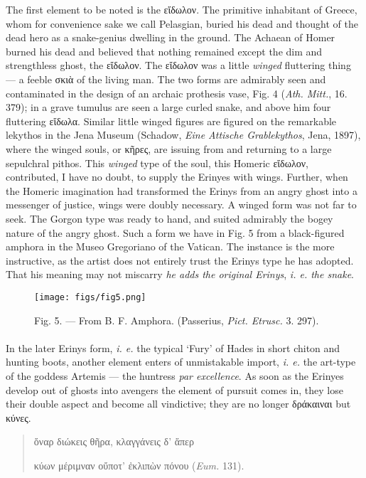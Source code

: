 \documentclass[a4paper, 11pt, oneside, polutonikogreek, english]{article}
\begin{document}
The first element to be noted is the εἴδωλον. The primitive inhabitant of Greece, whom for convenience sake we call Pelasgian, buried his dead and thought of the dead hero as a snake-genius dwelling in the ground. The Achaean of Homer burned his dead and believed that nothing remained except the dim and strengthless ghost, the εἴδωλον. The εἴδωλον was a little \emph{winged} fluttering thing --- a feeble σκιὰ of the living man. The two forms are admirably seen and contaminated in the design of an archaic prothesis vase, Fig. 4 (\emph{Ath. Mitt.}, 16. 379); in a grave tumulus are seen a large curled snake, and above him four fluttering εἴδωλα. Similar little winged figures are figured on the remarkable lekythos in the Jena Museum (Schadow, \emph{Eine Attische Grablekythos}, Jena, 1897), where the winged souls, or κῆρες, are issuing from and returning to a large sepulchral pithos. This \emph{winged} type of the soul, this Homeric εἴδωλον, contributed, I have no doubt, to supply the Erinyes with wings. Further, when the Homeric imagination had transformed the Erinys from an angry ghost into a messenger of justice, wings were doubly necessary. A winged form was not far to seek. The Gorgon type was ready to hand, and suited admirably the bogey nature of the angry ghost. Such a form we have in Fig. 5 from a black-figured amphora in the Museo Gregoriano of the Vatican. The instance is the more instructive, as the artist does not entirely trust the Erinys type he has adopted. That his meaning may not miscarry \emph{he adds the original Erinys}, \emph{i. e. the snake}.
\begin{figure}[H]
\centering
\texttt{[image: figs/fig5.png]}
\caption{\Fontauri Fig. 5. --- From B. F. Amphora. (Passerius, \emph{Pict. Etrusc.} 3. 297).}
\end{figure}
\paragraph{}
In the later Erinys form, \emph{i. e.} the typical `Fury' of Hades in short chiton and hunting boots, another element enters of unmistakable import, \emph{i. e.} the art-type of the goddess Artemis --- the huntress \emph{par excellence}. As soon as the Erinyes develop out of ghosts into avengers the element of pursuit comes in, they lose their double aspect and become all vindictive; they are no longer δράκαιναι but κύνες.
\begin{quotation}
ὄναρ διώκεις θῆρα, κλαγγάνεις δ' ἅπερ

κύων μέριμναν οὔποτ' ἐκλιπὼν πόνου (\emph{Eum.} 131).
\end{quotation}
\end{document}
